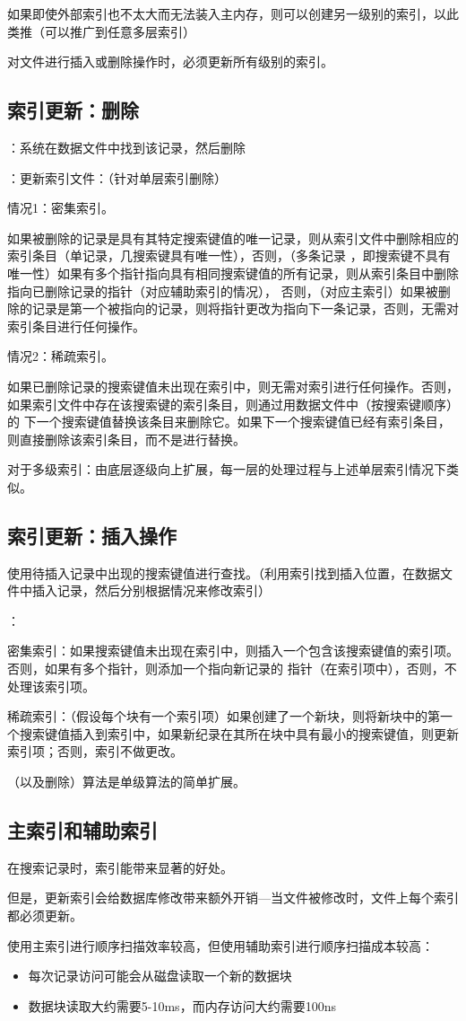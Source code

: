 如果即使外部索引也不太大而无法装入主内存，则可以创建另一级别的索引，以此类推（可以推广到任意多层索引）

对文件进行插入或删除操作时，必须更新所有级别的索引。

\subsection{索引更新：删除}

：系统在数据文件中找到该记录，然后删除

：更新索引文件：（针对单层索引删除）

情况1：密集索引。

如果被删除的记录是具有其特定搜索键值的唯一记录，则从索引文件中删除相应的索引条目（单记录，几搜索键具有唯一性），否则，（多条记录
，即搜索键不具有唯一性）如果有多个指针指向具有相同搜索键值的所有记录，则从索引条目中删除指向已删除记录的指针（对应辅助索引的情况），
否则，（对应主索引）如果被删除的记录是第一个被指向的记录，则将指针更改为指向下一条记录，否则，无需对索引条目进行任何操作。

情况2：稀疏索引。

如果已删除记录的搜索键值未出现在索引中，则无需对索引进行任何操作。否则，如果索引文件中存在该搜索键的索引条目，则通过用数据文件中（按搜索键顺序）的
下一个搜索键值替换该条目来删除它。如果下一个搜索键值已经有索引条目，则直接删除该索引条目，而不是进行替换。

对于多级索引：由底层逐级向上扩展，每一层的处理过程与上述单层索引情况下类似。

\subsection{索引更新：插入操作}

使用待插入记录中出现的搜索键值进行查找。（利用索引找到插入位置，在数据文件中插入记录，然后分别根据情况来修改索引）

：

密集索引：如果搜索键值未出现在索引中，则插入一个包含该搜索键值的索引项。否则，如果有多个指针，则添加一个指向新记录的
指针（在索引项中），否则，不处理该索引项。

稀疏索引：（假设每个块有一个索引项）如果创建了一个新块，则将新块中的第一个搜索键值插入到索引中，如果新纪录在其所在块中具有最小的搜索键值，则更新索引项；否则，索引不做更改。

（以及删除）算法是单级算法的简单扩展。

\subsection{主索引和辅助索引}

在搜索记录时，索引能带来显著的好处。

但是，更新索引会给数据库修改带来额外开销---当文件被修改时，文件上每个索引都必须更新。

使用主索引进行顺序扫描效率较高，但使用辅助索引进行顺序扫描成本较高：

\begin{itemize}
    \item 每次记录访问可能会从磁盘读取一个新的数据块
    \item 数据块读取大约需要5-10ms，而内存访问大约需要100ns
\end{itemize}

